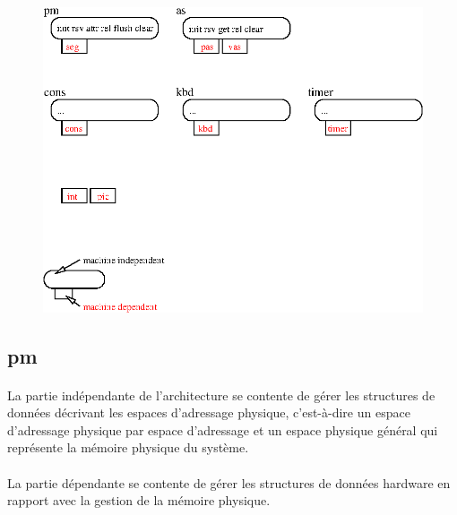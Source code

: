 \documentclass[10pt,a4wide]{article}
\begin{document}
\paragraph{}

\begin{figure}[h]
\centerline{\includegraphics{figures/visualisation.eps}}
\end{figure}

\subsection{pm}

\paragraph{}

La partie ind\'ependante de l'architecture se contente de g\'erer les
structures de donn\'ees d\'ecrivant les espaces d'adressage physique,
c'est-\`a-dire un espace d'adressage physique par espace d'adressage
et un espace physique g\'en\'eral qui repr\'esente la m\'emoire
physique du syst\`eme.

\paragraph{}

La partie d\'ependante se contente de g\'erer les structures de donn\'ees
hardware en rapport avec la gestion de la m\'emoire physique.

\paragraph{}
\end{document}
